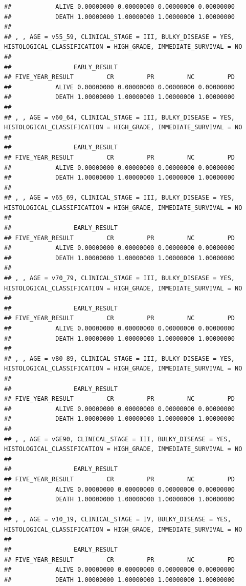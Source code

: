 \documentclass[]{article}
\begin{document}
\begin{verbatim}
##            ALIVE 0.00000000 0.00000000 0.00000000 0.00000000
##            DEATH 1.00000000 1.00000000 1.00000000 1.00000000
## 
## , , AGE = v55_59, CLINICAL_STAGE = III, BULKY_DISEASE = YES, HISTOLOGICAL_CLASSIFICATION = HIGH_GRADE, IMMEDIATE_SURVIVAL = NO
## 
##                 EARLY_RESULT
## FIVE_YEAR_RESULT         CR         PR         NC         PD
##            ALIVE 0.00000000 0.00000000 0.00000000 0.00000000
##            DEATH 1.00000000 1.00000000 1.00000000 1.00000000
## 
## , , AGE = v60_64, CLINICAL_STAGE = III, BULKY_DISEASE = YES, HISTOLOGICAL_CLASSIFICATION = HIGH_GRADE, IMMEDIATE_SURVIVAL = NO
## 
##                 EARLY_RESULT
## FIVE_YEAR_RESULT         CR         PR         NC         PD
##            ALIVE 0.00000000 0.00000000 0.00000000 0.00000000
##            DEATH 1.00000000 1.00000000 1.00000000 1.00000000
## 
## , , AGE = v65_69, CLINICAL_STAGE = III, BULKY_DISEASE = YES, HISTOLOGICAL_CLASSIFICATION = HIGH_GRADE, IMMEDIATE_SURVIVAL = NO
## 
##                 EARLY_RESULT
## FIVE_YEAR_RESULT         CR         PR         NC         PD
##            ALIVE 0.00000000 0.00000000 0.00000000 0.00000000
##            DEATH 1.00000000 1.00000000 1.00000000 1.00000000
## 
## , , AGE = v70_79, CLINICAL_STAGE = III, BULKY_DISEASE = YES, HISTOLOGICAL_CLASSIFICATION = HIGH_GRADE, IMMEDIATE_SURVIVAL = NO
## 
##                 EARLY_RESULT
## FIVE_YEAR_RESULT         CR         PR         NC         PD
##            ALIVE 0.00000000 0.00000000 0.00000000 0.00000000
##            DEATH 1.00000000 1.00000000 1.00000000 1.00000000
## 
## , , AGE = v80_89, CLINICAL_STAGE = III, BULKY_DISEASE = YES, HISTOLOGICAL_CLASSIFICATION = HIGH_GRADE, IMMEDIATE_SURVIVAL = NO
## 
##                 EARLY_RESULT
## FIVE_YEAR_RESULT         CR         PR         NC         PD
##            ALIVE 0.00000000 0.00000000 0.00000000 0.00000000
##            DEATH 1.00000000 1.00000000 1.00000000 1.00000000
## 
## , , AGE = vGE90, CLINICAL_STAGE = III, BULKY_DISEASE = YES, HISTOLOGICAL_CLASSIFICATION = HIGH_GRADE, IMMEDIATE_SURVIVAL = NO
## 
##                 EARLY_RESULT
## FIVE_YEAR_RESULT         CR         PR         NC         PD
##            ALIVE 0.00000000 0.00000000 0.00000000 0.00000000
##            DEATH 1.00000000 1.00000000 1.00000000 1.00000000
## 
## , , AGE = v10_19, CLINICAL_STAGE = IV, BULKY_DISEASE = YES, HISTOLOGICAL_CLASSIFICATION = HIGH_GRADE, IMMEDIATE_SURVIVAL = NO
## 
##                 EARLY_RESULT
## FIVE_YEAR_RESULT         CR         PR         NC         PD
##            ALIVE 0.00000000 0.00000000 0.00000000 0.00000000
##            DEATH 1.00000000 1.00000000 1.00000000 1.00000000

\end{verbatim}
\end{document}
